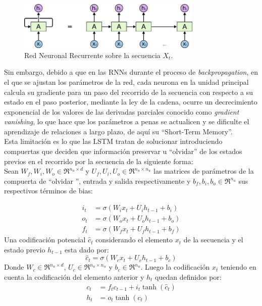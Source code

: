 	\begin{figure}[!thb]
		\begin{center}
			\includegraphics[width=250pt]{images/rnn.png}
		\end{center}
		\caption[Red Neuronal Recurrente]{Red Neuronal Recurrente sobre la secuencia $X_t$. \citep{agarwala2017music}}
		\label{rnn}
	\end{figure}
	Sin embargo, debido a que en las RNNs durante el proceso de \textit{backpropagation}, en el que se ajustan los parámetros de la red, cada neurona en la unidad principal calcula su gradiente para un paso del recorrido de la secuencia con respecto a su estado en el paso posterior, mediante la ley de la cadena, ocurre un decrecimiento exponencial de los valores de las derivadas parciales conocido como \textit{gradient vanishing}, lo que hace que los parámetros a penas se actualicen y se dificulte el aprendizaje de relaciones a largo plazo, de aquí su ``Short-Term Memory''.
	\\
	Esta limitación es lo que las LSTM tratan de solucionar introduciendo compuertas que deciden que información preservar u ``olvidar'' de los estados previos en el recorrido por la secuencia de la siguiente forma:
	\\
	Sean $W_f, W_i, W_o \in \Re^{n_u\times d}$ y $U_f, U_i, U_o \in \Re^{n_u\times n_u}$ las matrices de parámetros de la compuerta de ``olvidar '', entrada y salida respectivamente y $b_f, b_i, b_o \in \Re^{n_u}$ sus respectivos términos de bias:
	
	\begin{equation}
		\begin{split}
		i_{t} &= \sigma(W_i x_t + U_i  h_{t-1} + b_i)\\
		o_{t} &= \sigma(W_o x_t + U_o h_{t-1} + b_o)\\
		f_t &= \sigma(W_{f} x_t + U_f   h_{t-1} + b_f) 
		\end{split}
		\label{lstm_gates}
	\end{equation}
	Una codificación potencial $\hat{c}_t$ considerando el elemento $x_t$ de la secuencia y el estado previo $h_{t-1}$ esta dado por:
	\begin{equation}
		\hat{c}_{t} = \sigma(W_cx_t + U_c h_{t-1} + b_c)
		\label{lstm_pu}
	\end{equation}
	Donde $W_c\in\Re^{n_u\times d}$, $U_c\in\Re^{n_u\times n_u}$ y  $b_c\in\Re^{n_u}$. Luego la codificación $x_t$ teniendo en cuenta la codificación del elemento anterior y $h_t$ quedan definidos por:
	 \begin{equation}
	 	\begin{split}
	 		c_{t} &= f_tc_{t-1} +i_t\tanh(\hat{c}_{t})\\
	 		h_t &= o_t\tanh(c_t)
	 	\end{split}
	 	\label{lstm_hstate}
	 \end{equation}
 
